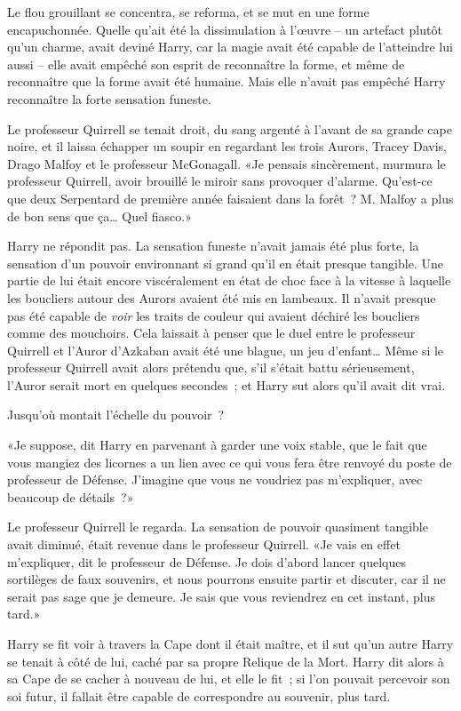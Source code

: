 Le flou grouillant se concentra, se reforma, et se mut en une forme encapuchonnée. Quelle qu'ait été la dissimulation à l'œuvre -- un artefact plutôt qu'un charme, avait deviné Harry, car la magie avait été capable de l'atteindre lui aussi -- elle avait empêché son esprit de reconnaître la forme, et même de reconnaître que la forme avait été humaine. Mais elle n'avait pas empêché Harry reconnaître la forte sensation funeste.

Le professeur Quirrell se tenait droit, du sang argenté à l'avant de sa grande cape noire, et il laissa échapper un soupir en regardant les trois Aurors, Tracey Davis, Drago Malfoy et le professeur McGonagall. «Je pensais sincèrement, murmura le professeur Quirrell, avoir brouillé le miroir sans provoquer d'alarme. Qu'est-ce que deux Serpentard de première année faisaient dans la forêt~? M. Malfoy a plus de bon sens que ça… Quel fiasco.»

Harry ne répondit pas. La sensation funeste n'avait jamais été plus forte, la sensation d'un pouvoir environnant si grand qu'il en était presque tangible. Une partie de lui était encore viscéralement en état de choc face à la vitesse à laquelle les boucliers autour des Aurors avaient été mis en lambeaux. Il n'avait presque pas été capable de \emph{voir} les traits de couleur qui avaient déchiré les boucliers comme des mouchoirs. Cela laissait à penser que le duel entre le professeur Quirrell et l'Auror d'Azkaban avait été une blague, un jeu d'enfant… Même si le professeur Quirrell avait alors prétendu que, s'il s'était battu sérieusement, l'Auror serait mort en quelques secondes~; et Harry sut alors qu'il avait dit vrai.

Jusqu'où montait l'échelle du pouvoir~?

«Je suppose, dit Harry en parvenant à garder une voix stable, que le fait que vous mangiez des licornes a un lien avec ce qui vous fera être renvoyé du poste de professeur de Défense. J'imagine que vous ne voudriez pas m'expliquer, avec beaucoup de détails~?»

Le professeur Quirrell le regarda. La sensation de pouvoir quasiment tangible avait diminué, était revenue dans le professeur Quirrell. «Je vais en effet m'expliquer, dit le professeur de Défense. Je dois d'abord lancer quelques sortilèges de faux souvenirs, et nous pourrons ensuite partir et discuter, car il ne serait pas sage que je demeure. Je sais que vous reviendrez en cet instant, plus tard.»

Harry se fit voir à travers la Cape dont il était maître, et il sut qu'un autre Harry se tenait à côté de lui, caché par sa propre Relique de la Mort. Harry dit alors à sa Cape de se cacher à nouveau de lui, et elle le fit~; si l'on pouvait percevoir son soi futur, il fallait être capable de correspondre au souvenir, plus tard.

